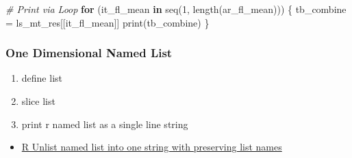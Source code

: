 \documentclass[
]{book}
\newenvironment{Shaded}{\begin{snugshade}}{\end{snugshade}}
\newcommand{\CommentTok}[1]{\textcolor[rgb]{0.56,0.35,0.01}{\textit{#1}}}
\newcommand{\ControlFlowTok}[1]{\textcolor[rgb]{0.13,0.29,0.53}{\textbf{#1}}}
\newcommand{\DecValTok}[1]{\textcolor[rgb]{0.00,0.00,0.81}{#1}}
\newcommand{\FunctionTok}[1]{\textcolor[rgb]{0.00,0.00,0.00}{#1}}
\newcommand{\NormalTok}[1]{#1}
\newcommand{\OtherTok}[1]{\textcolor[rgb]{0.56,0.35,0.01}{#1}}
\newcommand{\SpecialCharTok}[1]{\textcolor[rgb]{0.00,0.00,0.00}{#1}}
\newcommand{\StringTok}[1]{\textcolor[rgb]{0.31,0.60,0.02}{#1}}
\providecommand{\tightlist}{%
  \setlength{\itemsep}{0pt}\setlength{\parskip}{0pt}}
\begin{document}
\begin{Shaded}
\begin{Highlighting}[]
\CommentTok{\# Print via Loop }
\ControlFlowTok{for}\NormalTok{ (it\_fl\_mean }\ControlFlowTok{in} \FunctionTok{seq}\NormalTok{(}\DecValTok{1}\NormalTok{, }\FunctionTok{length}\NormalTok{(ar\_fl\_mean))) \{}
\NormalTok{  tb\_combine }\OtherTok{=}\NormalTok{ ls\_mt\_res[[it\_fl\_mean]]}
  \FunctionTok{print}\NormalTok{(tb\_combine)}
\NormalTok{\}}
\end{Highlighting}
\end{Shaded}

\hypertarget{one-dimensional-named-list}{%
\subsubsection{One Dimensional Named List}\label{one-dimensional-named-list}}

\begin{enumerate}
\def\labelenumi{\arabic{enumi}.}
\tightlist
\item
  define list
\item
  slice list
\item
  print r named list as a single line string
\end{enumerate}

\begin{itemize}
\tightlist
\item
  \href{https://stackoverflow.com/a/55622024/8280804}{R Unlist named list into one string with preserving list names}
\end{itemize}

\begin{Shaded}
\end{Shaded}
\end{document}
